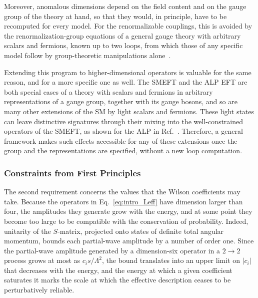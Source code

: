
Moreover, anomalous dimensions depend on the field content and on the gauge group of the theory at
hand, so that they would, in principle, have to be recomputed for every model. For the renormalizable
couplings, this is avoided by the renormalization-group equations of a general gauge theory with
arbitrary scalars and fermions, known up to two loops, from which those of any specific model follow
by group-theoretic manipulations
alone~\cite{Machacek:1983tz,Machacek:1983fi,Machacek:1984zw,Jack:1984vj}.

Extending this program to higher-dimensional operators is valuable for the same reason, and for a
more specific one as well. The SMEFT and the ALP EFT are both special cases of a theory with scalars
and fermions in arbitrary representations of a gauge group, together with its gauge bosons,
and so are many other extensions of the SM by light scalars and fermions. These light
states can leave distinctive signatures through their mixing into the well-constrained operators of
the SMEFT, as shown for the ALP in Ref.~\cite{Galda:2021hbr}. Therefore, a general framework makes
such effects accessible for any of these extensions once the group and the representations are
specified, without a new loop computation.

\subsubsection*{Constraints from First Principles}

The second requirement concerns the values that the Wilson coefficients may take. Because the operators
in Eq.~\eqref{eq:intro_Leff} have dimension larger than four, the amplitudes they generate grow with
the energy, and at some point they become too large to be compatible with the conservation of
probability. Indeed, unitarity of the $S$-matrix, projected onto states of definite total angular
momentum, bounds each partial-wave amplitude by a number of order one. Since the partial-wave
amplitude generated by a dimension-six operator in a $2\to2$ process grows at most as $c_i
s/\Lambda^2$, the bound translates into an upper limit on $|c_i|$ that decreases with the energy,
and the energy at which a given coefficient saturates it marks the scale at which the effective
description ceases to be perturbatively reliable. 

